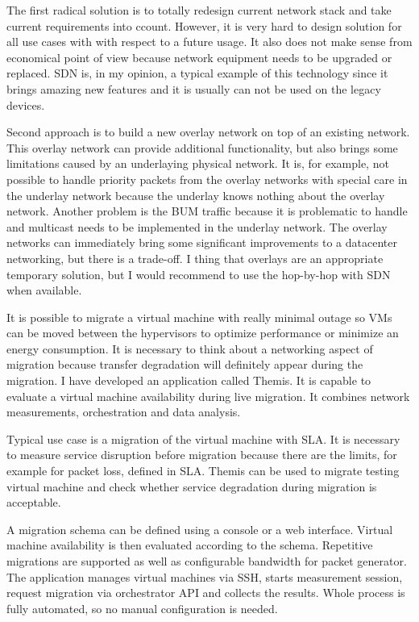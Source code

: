 The first radical solution is to totally redesign current network stack and take current requirements into ccount. However, it is very hard to design solution for all use cases with with respect to a future usage. It also does not make sense from economical point of view because network equipment needs to be upgraded or replaced. \Ac{SDN} is, in my opinion, a typical example of this technology since it brings amazing new features and it is usually can not be used on the legacy devices.

Second approach is to build a new overlay network on top of an existing network. This overlay network can provide additional functionality, but also brings some limitations caused by an underlaying physical network. It is, for example, not possible to handle priority packets from the overlay networks with special care in the underlay network because the underlay knows nothing about the overlay network. Another problem is the \Ac{BUM} traffic because it is problematic to handle and multicast needs to be implemented in the underlay network.
The overlay networks can immediately bring some significant improvements to a datacenter networking, but there is a trade-off. I thing that overlays are an appropriate temporary solution, but I would recommend to use the hop-by-hop with \Ac{SDN} when available.

It is possible to migrate a virtual machine with really minimal outage so \Ac{VM}s can be moved between the hypervisors to optimize performance or minimize an energy consumption. It is necessary to think about a networking aspect of migration because transfer degradation will definitely appear during the migration. I have developed an application called Themis. It is capable to evaluate a virtual machine availability during live migration. It combines network measurements, orchestration and data analysis.

Typical use case is a migration of the virtual machine with \Ac{SLA}. It is necessary to measure service disruption before migration because there are the limits, for example for packet loss, defined in \Ac{SLA}. Themis can be used to migrate testing virtual machine and check whether service degradation during migration is acceptable.

A migration schema can be defined using a console or a web interface. Virtual machine availability is then evaluated according to the schema. Repetitive migrations are supported as well as configurable bandwidth for packet generator. 
The application manages virtual machines via \Ac{SSH}, starts measurement session, request migration via orchestrator \Ac{API} and collects the results. Whole process is fully automated, so no manual configuration is needed. 

